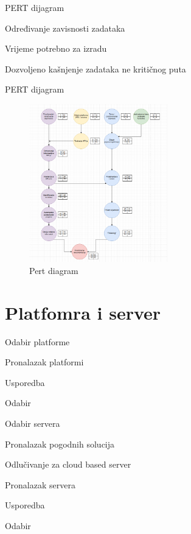 \documentclass[aspectratio=169,xcolor=dvipsnames]{beamer}
\begin{document}

\begin{frame}{PERT dijagram}
    \item Određivanje zavisnosti zadataka 
    \item Vrijeme potrebno za izradu
    \item Dozvoljeno kašnjenje zadataka ne kritičnog puta
    
\end{frame}

\begin{frame}{PERT dijagram}
    \begin{figure}
        \centering
        \includegraphics[width=6cm]{pert}
        \caption{Pert diagram}
        \label{fig:pert}
    \end{figure}
\end{frame}

\section{Platfomra i server}

\begin{frame}{Odabir platforme}
    \item Pronalazak platformi 
    \item Usporedba 
    \item Odabir
\end{frame}


\begin{frame}{Odabir servera}
    \item Pronalazak pogodnih solucija
    \item Odlučivanje za cloud based server
    \item Pronalazak servera
    \item Usporedba
    \item Odabir
\end{frame}
\end{document}
